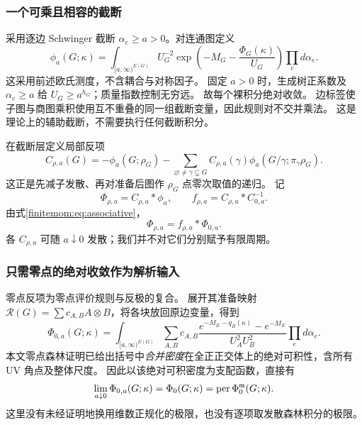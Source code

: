 \documentclass[11pt,a4paper,oneside]{ctexart}
\theoremstyle{cnplain}
\theoremstyle{definition}
\theoremstyle{remark}
\numberwithin{equation}{section}
\begin{document}
\subsubsection{一个可乘且相容的截断}
采用逐边 Schwinger 截断 $\alpha_e\geq a>0$。对连通图定义
\begin{equation}\label{finitemom:eq:cutoff}
 \phi_a(G;\kappa)=\int_{[a,\infty)^{E(G)}}
    U_G^{-2}\exp\left(-M_G-\frac{\Phi_G(\kappa)}{U_G}\right)
                                  \prod_e d\alpha_e.
\end{equation}
这采用前述欧氏测度，不含耦合与对称因子。
固定 $a>0$ 时，生成树正系数及 $\alpha_e\geq a$ 给 $U_G\geq a^{h_G}$；质量指数控制无穷远。
故每个裸积分绝对收敛。
边标签使子图与商图乘积使用互不重叠的同一组截断变量，因此规则对不交并乘法。
这是理论上的辅助截断，不需要执行任何截断积分。

在截断层定义局部反项
\begin{equation}\label{finitemom:eq:counterterm}
 C_{\rho,a}(G)=-\phi_a(G;\rho_G)
  -\sum_{\varnothing\ne\gamma\subsetneq G}
       C_{\rho,a}(\gamma)\phi_a(G/\gamma;\pi_\gamma\rho_G).
\end{equation}
这正是先减子发散、再对准备后图作 $\rho_G$ 点零次取值的递归。
记
\begin{equation}\label{finitemom:eq:regulated}
 \Phi_{\rho,a}=C_{\rho,a}*\phi_a,
 \qquad f_{\rho,a}=C_{\rho,a}*C_{0,a}^{-1}.
\end{equation}
由式\eqref{finitemom:eq:associative}，
\begin{equation}\label{finitemom:eq:regulatedaction}
 \Phi_{\rho,a}=f_{\rho,a}*\Phi_{0,a}.
\end{equation}
各 $C_{\rho,a}$ 可随 $a\downarrow0$ 发散；我们并不对它们分别赋予有限周期。

\subsubsection{只需零点的绝对收敛作为解析输入}
零点反项为零点评价规则与反极的复合。
展开其准备映射 $\mathcal R(G)=\sum c_{A,B}A\otimes B$，将各块放回原边变量，得到
\begin{equation}\label{finitemom:eq:zerodensity}
 \Phi_{0,a}(G;\kappa)=
 \int_{[a,\infty)^{E(G)}}
 \sum_{A,B}c_{A,B}
 \frac{e^{-M_E-q_B(\kappa)}-e^{-M_E}}{U_A^2U_B^2}
                                  \prod_e d\alpha_e.
\end{equation}
本文零点森林证明已给出括号中\emph{合并密度}在全正正交体上的绝对可积性，含所有 UV 角点及整体尺度。
因此以该绝对可积密度为支配函数，直接有
\begin{equation}\label{finitemom:eq:zerolimit}
 \lim_{a\downarrow0}\Phi_{0,a}(G;\kappa)
              =\Phi_0(G;\kappa)=\operatorname{per}\Phi_0^{\mathfrak m}(G;\kappa).
\end{equation}
这里没有未经证明地换用维数正规化的极限，也没有逐项取发散森林积分的极限。
\end{document}
